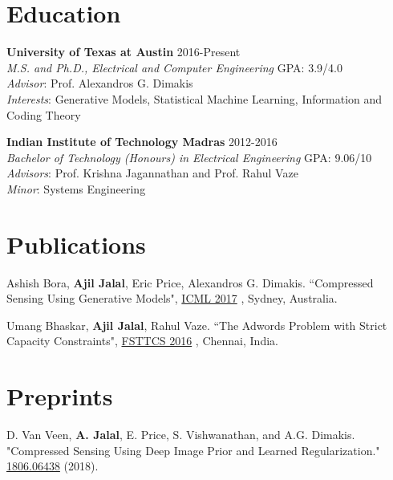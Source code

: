 \documentclass[margin, 11pt]{res} %
\begin{document}
\vspace*{-13pt}
\begin{resume}

 
\section{\large Education}
{\bf University of Texas at Austin} \hfill 2016-Present\\
{\sl M.S. and Ph.D., Electrical and Computer Engineering} \hfill GPA: 3.9/4.0 \\
{\sl Advisor}: Prof. Alexandros G. Dimakis \\
{\sl Interests}: Generative Models, Statistical Machine Learning, Information and Coding Theory

{\bf Indian Institute of Technology Madras} \hfill 2012-2016\\
{\sl Bachelor of Technology (Honours) in Electrical Engineering} \hfill GPA: 9.06/10 \\
{\sl Advisors}: Prof. Krishna Jagannathan and Prof. Rahul Vaze \\
{\sl Minor}: Systems Engineering 

\section{\large Publications} 
Ashish Bora, {\bf Ajil Jalal}, Eric Price, Alexandros G. Dimakis. ``Compressed Sensing Using Generative Models", \href{http://proceedings.mlr.press/v70/bora17a/bora17a.pdf}{ICML 2017} , Sydney, Australia.

Umang Bhaskar, {\bf Ajil Jalal}, Rahul Vaze. ``The Adwords Problem with Strict Capacity Constraints", \href{http://drops.dagstuhl.de/opus/volltexte/2016/6907/pdf/lipics-vol65-fsttcs2016-complete.pdf#page=365}{FSTTCS 2016} , Chennai, India.

\section{\large Preprints}
D. Van Veen, {\bf A. Jalal}, E. Price, S. Vishwanathan, and A.G. Dimakis. "Compressed Sensing Using Deep Image Prior and Learned Regularization." \href{https://arxiv.org/abs/1806.06438}{1806.06438} (2018).\\


\end{resume}
\end{document}
